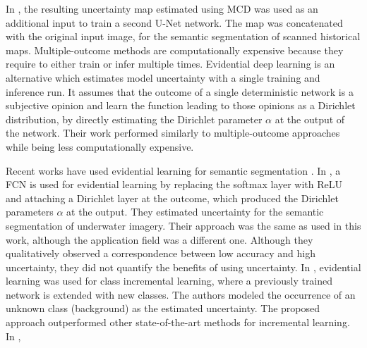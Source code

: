 In \cite{wu2022closer}, the resulting uncertainty map estimated using MCD was used as an additional input to train a second U-Net network. The map was concatenated with the original input image, for the semantic segmentation of scanned historical maps. %
Multiple-outcome methods are computationally expensive because they require to either train or infer multiple times. Evidential deep learning \cite{sensoy2018evidential} is an alternative which estimates model uncertainty with a single training and inference run. It assumes that the outcome of a single deterministic network is a subjective opinion and learn the function leading to those opinions as a Dirichlet distribution, by directly estimating the Dirichlet parameter $\alpha$ at the output of the network. Their work performed similarly to multiple-outcome approaches while being less computationally expensive. 

Recent works have used evidential learning for semantic segmentation \cite{do2022epistemic, holmquist2023evidential, tong2021evidential}. In \cite{do2022epistemic}, a FCN is used for evidential learning by replacing the softmax layer with ReLU and attaching a Dirichlet layer at the outcome, which produced the Dirichlet parameters $\alpha$ at the output. They estimated uncertainty for the semantic segmentation of underwater imagery. Their approach was the same as used in this work, although the application field was a different one. Although they qualitatively observed a correspondence between low accuracy and high uncertainty, they did not quantify the benefits of using uncertainty. In \cite{holmquist2023evidential}, evidential learning was used for class incremental learning, where a previously trained network is extended with new classes. The authors modeled the occurrence of an unknown class (background) as the estimated uncertainty. The proposed approach outperformed other state-of-the-art methods for incremental learning. In \cite{tong2021evidential}, 


